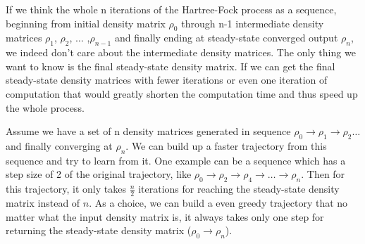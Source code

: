 \documentclass[twoside]{article}
\begin{document}




If we think the whole n iterations of the Hartree-Fock process as a sequence, beginning from initial density matrix $\rho_0$ through n-1 intermediate density matrices $\rho_1$,  $\rho_2$,  $\ldots$ ,$\rho_{n-1}$ and finally ending at steady-state converged output $\rho_{n}$, we indeed don't care about the intermediate density matrices. The only thing we want to know is the final steady-state density matrix. If we can get the final steady-state density matrices with fewer iterations or even one iteration of computation that would greatly shorten the computation time and thus speed up the whole process. 



Assume we have a set of n density matrices generated in sequence   $\rho_0 \rightarrow  \rho_1 \rightarrow  \rho_2  \ldots  $ and finally converging at $\rho_{n}$. 
We can build up a faster trajectory from this sequence and try to learn from it.
One example can be a sequence which has a step size of 2 of the original trajectory, like $\rho_0 \rightarrow \rho_2 \rightarrow  \rho_4 \rightarrow  \ldots \rightarrow  \rho_{n}$. Then for this trajectory, it only takes $\frac{n}{2}$ iterations for reaching the steady-state density matrix instead of $n$.
As a choice, we can build a even greedy trajectory that no matter what the input density matrix is, it always takes only one step for returning the steady-state density matrix ($\rho_0 \rightarrow \rho_{n}$).
\end{document}
